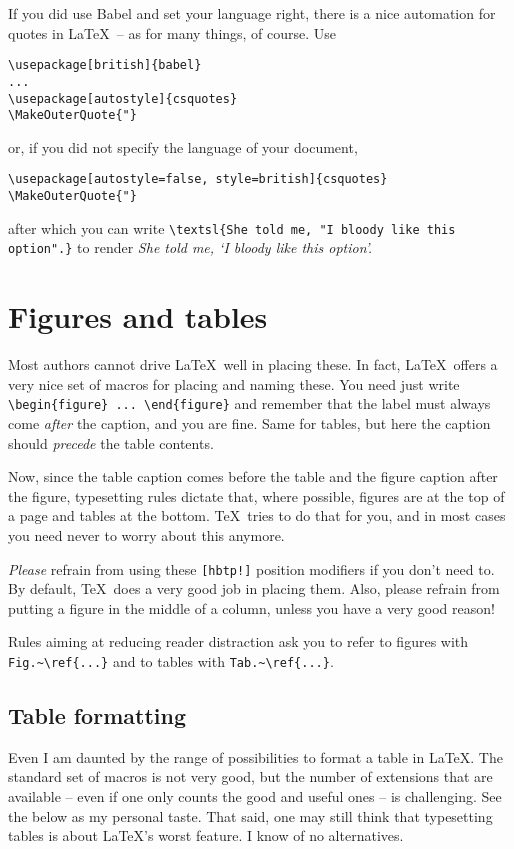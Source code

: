 \documentclass{article}
\begin{document}
If you did use Babel and set your language right, there is a nice automation for quotes in \LaTeX\ -- as for many things, of course.  Use 
\begin{verbatim}
\usepackage[british]{babel}
...
\usepackage[autostyle]{csquotes}
\MakeOuterQuote{"}
\end{verbatim} 
or, if you did not specify the language of your document,
\begin{verbatim}
\usepackage[autostyle=false, style=british]{csquotes}
\MakeOuterQuote{"}
\end{verbatim} 
after which you can write \verb|\textsl{She told me, "I bloody like this option".}| to render
\textsl{She told me, `I bloody like this option'.} %



\section{Figures and tables}
Most authors cannot drive \LaTeX\ well in placing these.  In fact, \LaTeX\ offers a very nice set of macros for placing and naming these.  You need just write \verb+\begin{figure} ... \end{figure}+ and remember that the label must always come \textsl{after} the caption, and you are fine.  Same for tables, but here the caption should \textsl{precede} the table contents.

Now, since the table caption comes before the table and the figure caption after the figure, typesetting rules dictate that, where possible, figures are at the top of a page and tables at the bottom.  \TeX\ tries to do that for you, and in most cases you need never to worry about this anymore.

\textsl{Please} refrain from using these \verb+[hbtp!]+ position modifiers if you don't need to.  By default, \TeX\ does a very good job in placing them.  Also, please refrain from putting a figure in the middle of a column, unless you have a very good reason!

Rules aiming at reducing reader distraction ask you to refer to figures with \verb+Fig.~\ref{...}+ and to tables with \verb+Tab.~\ref{...}+.

\subsection{Table formatting}
Even I am daunted by the range of possibilities to format a table in \LaTeX. The standard set of macros is not very good, but the number of extensions that are available -- even if one only counts the good and useful ones -- is challenging. See the below as my personal taste.  That said, one may still think that typesetting tables is about \LaTeX's worst feature.  I know of no alternatives.
\end{document}
